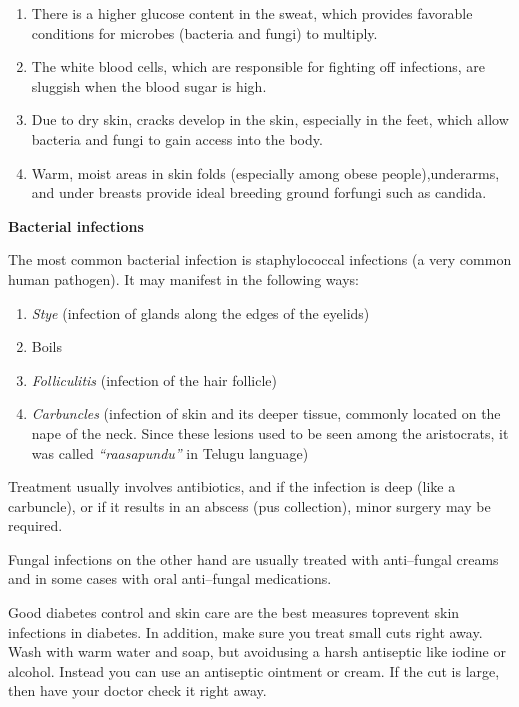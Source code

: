 \begin{enumerate}[•]
\itemsep=0pt
\item There is a higher glucose content in the sweat, which provides favo\-rable conditions for microbes (bacteria and fungi) to multiply.
\item The white blood cells, which are responsible for fighting off infe\-ctions, are sluggish when the blood sugar is high.
\item Due to dry skin, cracks develop in the skin, especially in the feet, which allow bacteria and fungi to gain access into the body.
\item Warm, moist areas in skin folds (especially among obese people),\break underarms, and under breasts provide ideal breeding ground for\break fungi such as candida.
\end{enumerate}

\noindent\textbf{Bacterial infections}

The most common bacterial infection is staphylococcal infections (a very common human pathogen). It may manifest in the following ways:

\begin{enumerate}[•]
\itemsep=0pt
\item \textit{Stye} (infection of glands along the edges of the eyelids)
\item Boils
\item \textit{Folliculitis} (infection of the hair follicle)
\item \textit{Carbuncles} (infection of skin and its deeper tissue, commonly located on the nape of the neck. Since these lesions used to be seen among the aristocrats, it was called \textit{“raasapundu”} in Telugu language)
\end{enumerate}

Treatment usually involves antibiotics, and if the infection is deep (like a carbuncle), or if it results in an abscess (pus collection), minor surgery may be required.

Fungal infections on the other hand are usually treated with anti–fungal creams and in some cases with oral anti–fungal medications.

Good diabetes control and skin care are the best measures to\break prevent skin infections in diabetes. In addition, make sure you treat small cuts right away. Wash with warm water and soap, but avoid\break using a harsh antiseptic like iodine or alcohol. Instead you can use an antiseptic ointment or cream. If the cut is large, then have your doctor check it right away.

